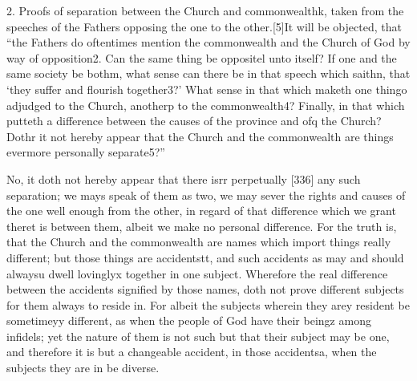 2. Proofs of separation between the Church and commonwealthk, taken from the speeches of the Fathers opposing the one to the other.[5]It will be objected, that “the Fathers do oftentimes mention the commonwealth and the Church of God by way of opposition2. Can the same thing be oppositel unto itself? If one and the same society be bothm, what sense can there be in that speech which saithn, that ‘they suffer and flourish together3?’ What sense in that which maketh one thingo adjudged to the Church, anotherp to the commonwealth4? Finally, in that which putteth a difference between the causes of the province and ofq the Church? Dothr it not hereby appear that the Church and the commonwealth are things evermore personally separate5?”

No, it doth not hereby appear that there isrr perpetually [336] any such separation; we mays speak of them as two, we may sever the rights and causes of the one well enough from the other, in regard of that difference which we grant theret is between them, albeit we make no personal difference. For the truth is, that the Church and the commonwealth are names which import things really different; but those things are accidentstt, and such accidents as may and should alwaysu dwell lovinglyx together in one subject. Wherefore the real difference between the accidents signified by those names, doth not prove different subjects for them always to reside in. For albeit the subjects wherein they arey resident be sometimeyy different, as when the people of God have their beingz among infidels; yet the nature of them is not such but that their subject may be one, and therefore it is but a changeable accident, in those accidentsa, when the subjects they are in be diverse.

